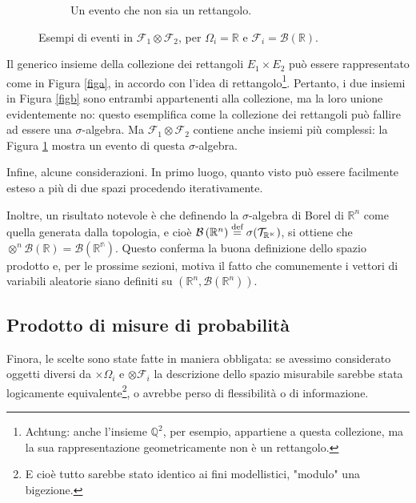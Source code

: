 \begin{figure}[H]
\begin{subfigure}{.3\textwidth}
		\caption{Un evento che non sia un rettangolo.}			\label{figc}	
	\end{subfigure}
	\caption{Esempi di eventi in $\mathcal{F}_1 \otimes \mathcal{F}_2$, per $\Omega_i=\mathbb{R}$ e $\mathcal{F}_i = \mathcal{B}(\mathbb{R})$.}	\label{fig}
\end{figure}	
Il generico insieme della collezione dei rettangoli $E_1 \times E_2$ può essere rappresentato come in Figura \ref{figa}, in accordo con l'idea di rettangolo\footnote{Achtung: anche l'insieme $\mathbb{Q}^2$, per esempio, appartiene a questa collezione, ma la sua rappresentazione geometricamente non è un rettangolo.}. 
Pertanto, i due insiemi in Figura \ref{figb} sono entrambi appartenenti alla collezione, ma la loro unione evidentemente no: questo esemplifica come la collezione dei rettangoli può fallire ad essere una $\sigma$-algebra. 
Ma $\mathcal{F}_1 \otimes \mathcal{F}_2$ contiene anche insiemi più complessi: la Figura \ref{figc} mostra un evento di questa $\sigma$-algebra.
\par Infine, alcune considerazioni. In primo luogo, quanto visto può essere facilmente esteso a più di due spazi procedendo iterativamente.
\par Inoltre, un risultato notevole è che definendo la $\sigma$-algebra di Borel di $\mathbb{R}^n$ come quella generata dalla topologia, e cioè $\mathcal{B}\left(\mathbb{R}^n\right) \stackrel{\text{def}}{=} \sigma(\mathcal{T}_\mathbb{R^n})$, si ottiene che $\otimes^n \mathcal{B}(\mathbb{R}) = \mathcal{B}\left(\mathbb{R^n}\right)$. Questo conferma la buona definizione dello spazio prodotto e, per le prossime sezioni, motiva il fatto che comunemente i vettori di variabili aleatorie siano definiti su $\left(\mathbb{R}^n,\mathcal{B}(\mathbb{R}^n)\right)$.

\subsection{Prodotto di misure di probabilità}
Finora, le scelte sono state fatte in maniera obbligata: se avessimo considerato oggetti diversi da $\times \Omega_i$ e $\otimes \mathcal{F}_i$ la descrizione dello spazio misurabile sarebbe stata logicamente equivalente\footnote{E cioè tutto sarebbe stato identico ai fini modellistici, "modulo" una bigezione.}, o avrebbe perso di flessibilità o di informazione.


